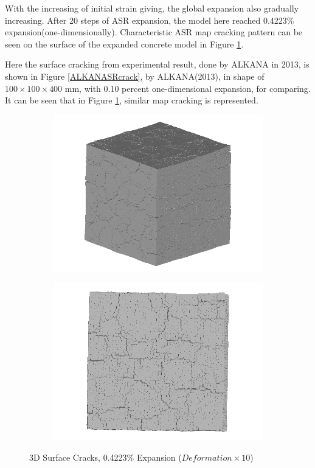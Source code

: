 \clearpage

With the increasing of initial strain giving, the global expansion also gradually increasing. After 20 steps of ASR expansion, the model here reached 0.4223\% expansion(one-dimensionally). Characteristic ASR map cracking pattern can be seen on the surface of the expanded concrete model in Figure \ref{fig:ASR_A30P75_3_3D_1}.

Here the surface cracking from experimental result, done by ALKANA in 2013, is shown in Figure \ref{ALKANASRcrack}, by ALKANA(2013)\cite{ALKANA}, in shape of $100 \times 100 \times 400$ mm, with 0.10 percent one-dimensional expansion, for comparing. It can be seen that in Figure \ref{fig:ASR_A30P75_3_3D_1}, similar map cracking is represented.



  \begin{figure}[ht]
  \centering
      \begin{subfigure}{.5\textwidth}
        \centering
        \includegraphics[width=.8\linewidth]{Files/exp_3D/ASR/A30P75_3_3d.png}
      \end{subfigure}%
      \begin{subfigure}{.5\textwidth}
        \centering
        \includegraphics[width=.8\linewidth]{Files/exp_3D/ASR/A30P75_3_3ds.png}
        \end{subfigure}
    \caption{3D Surface Cracks, 0.4223\% Expansion ($Deformation \times 10$)}
    \label{fig:ASR_A30P75_3_3D_1}
  \end{figure}


